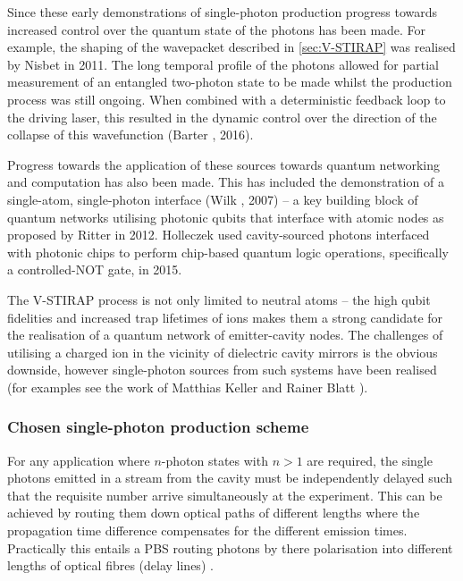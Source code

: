 \documentclass[../Thesis-IJspeert.tex]{subfiles}
\begin{document}
Since these early demonstrations of single-photon production progress towards increased control over the quantum state of the photons has been made. For example, the shaping of the wavepacket described in \cref{sec:V-STIRAP} was realised by Nisbet \etal{} \cite{nisbet11} in 2011. The long temporal profile of the photons allowed for partial measurement of an entangled two-photon state to be made whilst the production process was still ongoing. When combined with a deterministic feedback loop to the driving laser, this resulted in the dynamic control over the direction of the collapse of this wavefunction (Barter \etal{} \cite{barter16}, 2016).

Progress towards the application of these sources towards quantum networking and computation has also been made.  This has included the demonstration of a single-atom, single-photon interface (Wilk \etal{} \cite{wilk07b}, 2007) -- a key building block of quantum networks utilising photonic qubits that interface with atomic nodes as proposed by Ritter \etal{} \cite{ritter12} in 2012.  Holleczek \etal{} \cite{holleczek15} used cavity-sourced photons interfaced with photonic chips to perform chip-based quantum logic operations, specifically a controlled-NOT gate, in 2015.

The V-STIRAP process is not only limited to neutral atoms -- the high qubit fidelities and increased trap lifetimes of ions makes them a strong candidate for the realisation of a quantum network of emitter-cavity nodes.  The challenges of utilising a charged ion in the vicinity of dielectric cavity mirrors is the obvious downside, however single-photon sources from such systems have been realised (for examples see the work of Matthias Keller \cite{keller03, keller04,keller17} and Rainer Blatt \cite{blatt02, blatt09,blatt12}).

\subsubsection{Chosen single-photon production scheme}

For any application where $n$-photon states with $n>1$ are required, the single photons emitted in a stream from the cavity must be independently delayed such that the requisite number arrive simultaneously at the experiment.  This can be achieved by routing them down optical paths of different lengths where the propagation time difference compensates for the different emission times.  Practically this entails a PBS routing photons by there polarisation into different lengths of optical fibres (delay lines) \cite{nisbet13,dilley12,barter16,holleczek15,legero04}.
\end{document}
